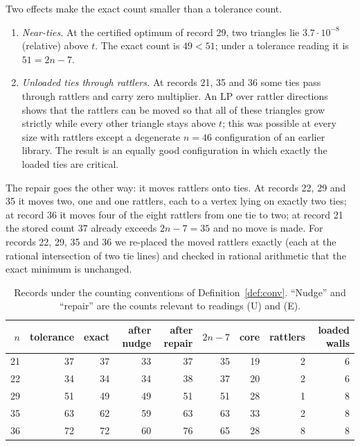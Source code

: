 \documentclass[11pt]{amsart}
\theoremstyle{definition}
\begin{document}
Two effects make the exact count smaller than a tolerance count. %
\begin{enumerate}[label=(\alph*)]
\item \emph{Near-ties.} At the certified optimum of record 29, two triangles lie $3.7\cdot10^{-8}$ (relative) above $t$. The exact count is $49 < 51$; under a tolerance reading it is $51 = 2n-7$.
\item \emph{Unloaded ties through rattlers.} At records 21, 35 and 36 some ties pass through rattlers and carry zero multiplier. An LP over rattler directions shows that the rattlers can be moved so that all of these triangles grow strictly while every other triangle stays above $t$; this was possible at every size with rattlers except a degenerate $n = 46$ configuration of an earlier library. The result is an equally good configuration in which exactly the loaded ties are critical.
\end{enumerate}
The repair goes the other way: it moves rattlers onto ties. %
At records 22, 29 and 35 it moves two, one and one rattlers, each to a vertex lying on exactly two ties; at record 36 it moves four of the eight rattlers from one tie to two; at record 21 the stored count $37$ already exceeds $2n-7 = 35$ and no move is made. For records 22, 29, 35 and 36 we re-placed the moved rattlers exactly (each at the rational intersection of two tie lines) and checked in rational arithmetic that the exact minimum is unchanged. %

\begin{table}[htbp]
\centering\small
\caption{Records under the counting conventions of Definition~\ref{def:conv}. ``Nudge'' and ``repair'' are the counts relevant to readings (U) and (E).}\label{tab:records}
\begin{tabular}{@{}rrrrrrrrr@{}}
\toprule
$n$ & tolerance & exact & after nudge & after repair & $2n-7$ & core & rattlers & loaded walls \\
\midrule
21 & 37 & 37 & 33 & 37 & 35 & 19 & 2 & 6 \\
22 & 34 & 34 & 34 & 38 & 37 & 20 & 2 & 6 \\
29 & 51 & 49 & 49 & 51 & 51 & 28 & 1 & 8 \\
35 & 63 & 62 & 59 & 63 & 63 & 33 & 2 & 8 \\
36 & 72 & 72 & 60 & 76 & 65 & 28 & 8 & 8 \\
\bottomrule
\end{tabular}
\end{table}
\end{document}
